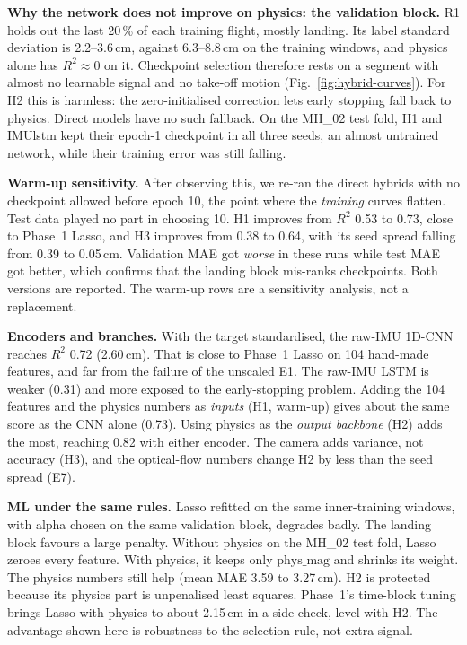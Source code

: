 \textbf{Why the network does not improve on physics: the validation
block.} R1 holds out the last 20\,\% of each training flight, mostly
landing. Its label standard deviation is 2.2--3.6\,cm, against
6.3--8.8\,cm on the training windows, and physics alone has
$R^2\approx0$ on it. Checkpoint selection therefore rests on a segment
with almost no learnable signal and no take-off motion
(Fig.~\ref{fig:hybrid-curves}). For H2 this is harmless: the zero-initialised
correction lets early stopping fall back to physics. Direct models have
no such fallback. On the MH\_02 test fold, H1 and IMUlstm kept their
epoch-1 checkpoint in all three seeds, an almost untrained network,
while their training error was still falling.

\textbf{Warm-up sensitivity.} After observing this, we re-ran the
direct hybrids with no checkpoint allowed before epoch 10, the point
where the \emph{training} curves flatten. Test data played no part in
choosing 10. H1 improves from $R^2$ 0.53 to 0.73, close to Phase~1
Lasso, and H3 improves from 0.38 to 0.64, with its seed spread falling
from 0.39 to 0.05\,cm. Validation MAE got \emph{worse} in these runs
while test MAE got better, which confirms that the landing block
mis-ranks checkpoints. Both versions are reported. The warm-up rows are a
sensitivity analysis, not a replacement.

\textbf{Encoders and branches.} With the target standardised, the raw-IMU
1D-CNN reaches $R^2$ 0.72 (2.60\,cm). That is close to Phase~1 Lasso on
104 hand-made features, and far from the failure of the unscaled E1. The
raw-IMU LSTM is weaker (0.31) and more exposed to the early-stopping
problem. Adding the 104 features and the physics numbers as \emph{inputs}
(H1, warm-up) gives about the same score as the CNN alone (0.73). Using
physics as the \emph{output backbone} (H2) adds the most, reaching 0.82
with either encoder. The camera adds variance, not accuracy (H3), and the
optical-flow numbers change H2 by less than the seed spread (E7).

\textbf{ML under the same rules.} Lasso refitted on the same
inner-training windows, with alpha chosen on the same validation block,
degrades badly. The landing block favours a large penalty. Without physics
on the MH\_02 test fold, Lasso zeroes every feature. With physics, it
keeps only $\mathrm{phys\_mag}$ and shrinks its weight. The physics
numbers still help (mean MAE 3.59 to 3.27\,cm). H2 is protected because
its physics part is unpenalised least squares. Phase~1's time-block
tuning brings Lasso with physics to about 2.15\,cm in a side check, level
with H2. The advantage shown here is robustness to the selection rule,
not extra signal.


